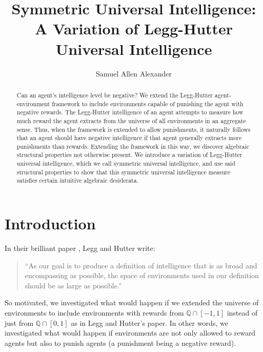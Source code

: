 \documentclass{article}
\title{Symmetric Universal Intelligence: A Variation of Legg-Hutter Universal Intelligence}
\author{Samuel Allen Alexander}
\begin{document}
\maketitle

\begin{abstract}
    Can an agent's intelligence level be negative?
    We extend the Legg-Hutter agent-environment framework to include environments
    capable of punishing the agent with negative rewards. The Legg-Hutter
    intelligence of an agent attempts to measure how much reward the agent
    extracts from the universe of all environments in an aggregate sense. Thus,
    when the framework is extended to allow punishments, it naturally follows
    that an agent should have negative intelligence if that agent generally
    extracts more punishments than rewards.
    Extending the framework in this way, we discover algebraic structural properties
    not otherwise present. We introduce a variation of Legg-Hutter universal
    intelligence, which we call symmetric universal intelligence, and use said
    structural properties to show that this symmetric universal intelligence
    measure satisfies certain intuitive algebraic desiderata.
\end{abstract}

\section{Introduction}

In their brilliant paper \cite{legg2007universal}, Legg and Hutter write:
\begin{quote}
    ``As our goal is to produce a definition of intelligence that is as broad and
    encompassing as possible, the space of environments used in our definition should
    be as large as possible.''
\end{quote}
So motivated, we investigated what would happen if we extended the universe
of environments to include environments with rewards from $\mathbb Q\cap [-1,1]$
instead of just from $\mathbb Q\cap [0,1]$ as in Legg and Hutter's paper.
In other words, we investigated what would happen if environments are not only
allowed to reward agents but also to punish agents (a punishment being a negative
reward).
\end{document}
